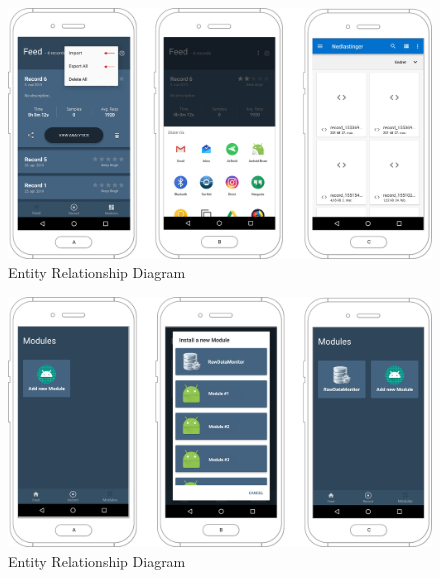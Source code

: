 \begin{figure}
    \centering
    \includegraphics[scale=0.26]{images/Sharing_img.pdf}
    \caption{Entity Relationship Diagram}
    \label{fig:impl_modules}
\end{figure}


\begin{figure}
    \centering
    \includegraphics[scale=0.26]{images/Modules_img.pdf}
    \caption{Entity Relationship Diagram}
    \label{fig:impl_modules}
\end{figure}


